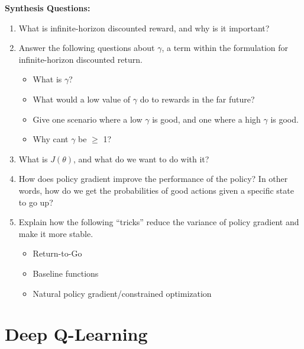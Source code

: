 \begin{questionbox}
\textbf{Synthesis Questions:}
\begin{enumerate}
    \item What is infinite-horizon discounted reward, and why is it important?
    \item Answer the following questions about $\gamma$, a term within the formulation for infinite-horizon discounted return.
    \begin{itemize}
        \item What is $\gamma$?
        \item What would a low value of $\gamma$ do to rewards in the far future?
        \item Give one scenario where a low $\gamma$ is good, and one where a high $\gamma$ is good.
        \item Why cant $\gamma$ be $\geq$ 1?
    \end{itemize}
    \item What is $J(\theta)$, and what do we want to do with it?
    \item How does policy gradient improve the performance of the policy? In other words, how do we get the probabilities of good actions given a specific state to go up?
    \item Explain how the following ``tricks'' reduce the variance of policy gradient and make it more stable.
    \begin{itemize}
        \item Return-to-Go
        \item Baseline functions
        \item Natural policy gradient/constrained optimization
    \end{itemize}
\end{enumerate}
\end{questionbox}


\section{Deep Q-Learning}

